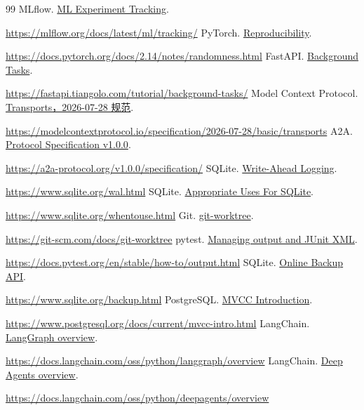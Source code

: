 \documentclass[11pt,a4paper]{article}
\begin{document}
\begin{thebibliography}{99}
 MLflow. \href{https://mlflow.org/docs/latest/ml/tracking/}{ML Experiment Tracking}.\par\url{https://mlflow.org/docs/latest/ml/tracking/}
 PyTorch. \href{https://docs.pytorch.org/docs/2.14/notes/randomness.html}{Reproducibility}.\par\url{https://docs.pytorch.org/docs/2.14/notes/randomness.html}
 FastAPI. \href{https://fastapi.tiangolo.com/tutorial/background-tasks/}{Background Tasks}.\par\url{https://fastapi.tiangolo.com/tutorial/background-tasks/}
 Model Context Protocol. \href{https://modelcontextprotocol.io/specification/2026-07-28/basic/transports}{Transports，2026-07-28 规范}.\par\url{https://modelcontextprotocol.io/specification/2026-07-28/basic/transports}
 A2A. \href{https://a2a-protocol.org/v1.0.0/specification/}{Protocol Specification v1.0.0}.\par\url{https://a2a-protocol.org/v1.0.0/specification/}
 SQLite. \href{https://www.sqlite.org/wal.html}{Write-Ahead Logging}.\par\url{https://www.sqlite.org/wal.html}
 SQLite. \href{https://www.sqlite.org/whentouse.html}{Appropriate Uses For SQLite}.\par\url{https://www.sqlite.org/whentouse.html}
 Git. \href{https://git-scm.com/docs/git-worktree}{git-worktree}.\par\url{https://git-scm.com/docs/git-worktree}
 pytest. \href{https://docs.pytest.org/en/stable/how-to/output.html}{Managing output and JUnit XML}.\par\url{https://docs.pytest.org/en/stable/how-to/output.html}
 SQLite. \href{https://www.sqlite.org/backup.html}{Online Backup API}.\par\url{https://www.sqlite.org/backup.html}
 PostgreSQL. \href{https://www.postgresql.org/docs/current/mvcc-intro.html}{MVCC Introduction}.\par\url{https://www.postgresql.org/docs/current/mvcc-intro.html}
\newpage
{} LangChain. \href{https://docs.langchain.com/oss/python/langgraph/overview}{LangGraph overview}.\par\url{https://docs.langchain.com/oss/python/langgraph/overview}
 LangChain. \href{https://docs.langchain.com/oss/python/deepagents/overview}{Deep Agents overview}.\par\url{https://docs.langchain.com/oss/python/deepagents/overview}

\end{thebibliography}
\end{document}
